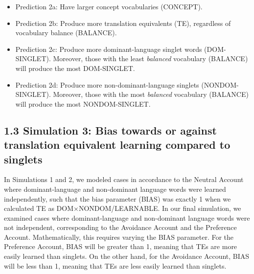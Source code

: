 \documentclass[
  english,
  ,man,floatsintext]{apa6}
\providecommand{\tightlist}{%
  \setlength{\itemsep}{0pt}\setlength{\parskip}{0pt}}
\begin{document}
\begin{itemize}
\tightlist
\item
  Prediction 2a: Have larger concept vocabularies (CONCEPT).
\item
  Prediction 2b: Produce more translation equivalents (TE), regardless of vocabulary balance (BALANCE).
\item
  Prediction 2c: Produce more dominant-language singlet words (DOM-SINGLET). Moreover, those with the least \emph{balanced} vocabulary (BALANCE) will produce the most DOM-SINGLET.
\item
  Prediction 2d: Produce more non-dominant-language singlets (NONDOM-SINGLET). Moreover, those with the most \emph{balanced} vocabulary (BALANCE) will produce the most NONDOM-SINGLET.
\end{itemize}

\hypertarget{simulation-3-bias-towards-or-against-translation-equivalent-learning-compared-to-singlets}{%
\subsection{1.3 Simulation 3: Bias towards or against translation equivalent learning compared to singlets}\label{simulation-3-bias-towards-or-against-translation-equivalent-learning-compared-to-singlets}}

In Simulations 1 and 2, we modeled cases in accordance to the Neutral Account where dominant-language and non-dominant language words were learned independently, such that the bias parameter (BIAS) was exactly 1 when we calculated TE as DOM×NONDOM/LEARNABLE. In our final simulation, we examined cases where dominant-language and non-dominant language words were not independent, corresponding to the Avoidance Account and the Preference Account. Mathematically, this requires varying the BIAS parameter. For the Preference Account, BIAS will be greater than 1, meaning that TEs are more easily learned than singlets. On the other hand, for the Avoidance Account, BIAS will be less than 1, meaning that TEs are less easily learned than singlets.
\end{document}
